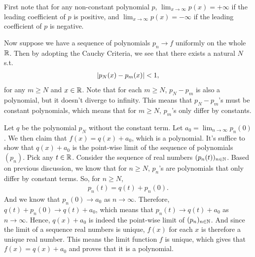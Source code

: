 \documentclass[12pt]{article}
\begin{document}
\begin{fproof}[2]
First note that for any non-constant polynomial \(p\), \(\lim_{x \to \infty} p(x) = +\infty\) if the leading coefficient of \(p\) is positive, and \(\lim_{x \to \infty} p(x) = -\infty\) if the leading coefficient of \(p\) is negative.

Now suppose we have a sequence of polynomials \(p_n \to f\) uniformly on the whole \(\mathbb {R}\).
Then by adopting the Cauchy Criteria, we see that there exists a natural \(N\) s.t. 
\begin{align*}
    \left\lvert p_N(x) - p_m(x) \right\rvert < 1,
\end{align*}
for any \(m \geq N\) and \(x \in \mathbb {R}\).
Note that for each \(m \geq N\), \(p_N - p_m\) is also a polynomial, but it doesn't diverge to infinity. This means that \(p_N - p_m\)'s must be constant polynomials, which means that for \(m \geq N\), \(p_m\)'s only differ by constants.

Let \(q\) be the polynomial \(p_N\) without the constant term. Let \(a_0 = \lim_{n \to \infty} p_n(0)\).
We then claim that \(f(x) = q(x) + a_0\), which is a polynomial.
It's suffice to show that \(q(x) + a_0\) is the point-wise limit of the sequence of polynomials \((p_n)\).
Pick any \(t \in \mathbb {R}\).
Consider the sequence of real numbers \((p_n(t))_{n \in \mathbb {N}}\).
Based on previous discussion, we know that for \(n \geq N\), \(p_n\)'s are polynomials that only differ by constant terms.
So, for \(n \geq N\),
\begin{align*}
    p_n(t) = q(t) + p_n(0).
\end{align*}
And we know that \(p_n(0) \to a_0\) as \(n \to \infty\).
Therefore, \(q(t) + p_n(0) \to q(t) + a_0\), which means that \(p_n(t) \to q(t) + a_0\) as \(n \to \infty\).
Hence, \(q(x) + a_0\) is indeed the point-wise limit of \((p_n)_{n \in \mathbb {N}}\).
And since the limit of a sequence real numbers is unique, \(f(x)\) for each \(x\) is therefore a unique real number. This means the limit function \(f\) is unique, which gives that \(f(x) = q(x) + a_0\) and proves that it is a polynomial.

\end{fproof}
\newpage
\end{document}
